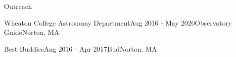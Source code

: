 \documentclass{resume} %
\begin{document}
\begin{rSection}{Outreach}

\begin{rSubsection}{Wheaton College Astronomy Department}{Aug 2016 - May 2020}{Observatory Guide}{Norton, MA}

\end{rSubsection}

\begin{rSubsection}{Best Buddies}{Aug 2016 - Apr 2017}{Bud}{Norton, MA}
\end{rSubsection}

\end{rSection}
\end{document}
